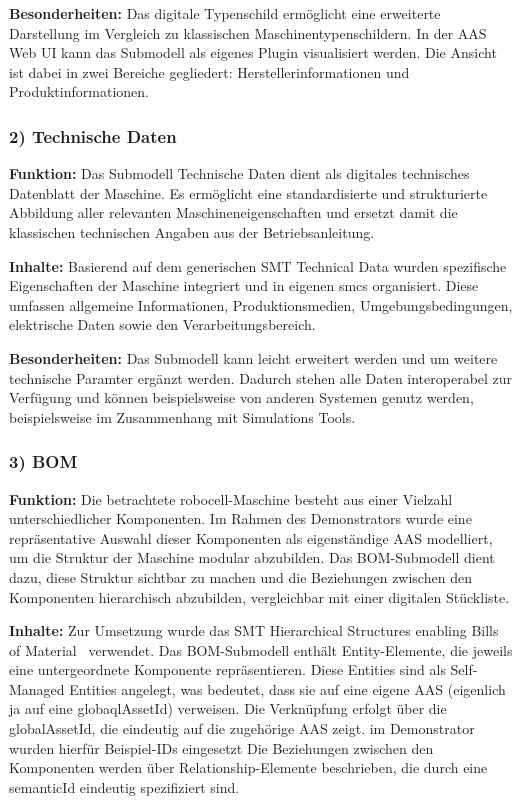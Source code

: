 \textbf{Besonderheiten:}  
Das digitale Typenschild ermöglicht eine erweiterte Darstellung im Vergleich zu klassischen Maschinentypenschildern.  
In der AAS Web UI kann das Submodell als eigenes Plugin visualisiert werden. 
Die Ansicht ist dabei in zwei Bereiche gegliedert: Herstellerinformationen und Produktinformationen.

\subsubsection*{2) Technische Daten}
\vspace{-0.5em}
\textbf{Funktion:}  
Das Submodell Technische Daten dient als digitales technisches Datenblatt der Maschine.
Es ermöglicht eine standardisierte und strukturierte Abbildung aller relevanten Maschineneigenschaften und ersetzt damit die klassischen technischen Angaben aus der Betriebsanleitung.

\textbf{Inhalte:}  
Basierend auf dem generischen SMT Technical Data \cite{SpezifikaitonTechnischeDaten} wurden spezifische Eigenschaften der Maschine integriert und in eigenen \acsp{smc} organisiert. 
Diese umfassen allgemeine Informationen, Produktionsmedien, Umgebungsbedingungen, elektrische Daten sowie den Verarbeitungsbereich.

\textbf{Besonderheiten:}  
Das Submodell kann leicht erweitert werden und um weitere technische Paramter ergänzt werden.
Dadurch stehen alle Daten interoperabel zur Verfügung und können beispielsweise von anderen Systemen genutz werden, beispielsweise im Zusammenhang mit Simulations Tools.

\subsubsection*{3) BOM}
\vspace{-0.5em}
\textbf{Funktion:}  
Die betrachtete robocell-Maschine besteht aus einer Vielzahl unterschiedlicher Komponenten.
Im Rahmen des Demonstrators wurde eine repräsentative Auswahl dieser Komponenten als eigenständige AAS modelliert, um die Struktur der Maschine modular abzubilden.
Das BOM-Submodell dient dazu, diese Struktur sichtbar zu machen und die Beziehungen zwischen den Komponenten hierarchisch abzubilden, vergleichbar mit einer digitalen Stückliste.

\textbf{Inhalte:}  
Zur Umsetzung wurde das SMT Hierarchical Structures enabling Bills of Material~\cite{SpezifikationHierachischeStrukturen} verwendet.
Das BOM-Submodell enthält Entity-Elemente, die jeweils eine untergeordnete Komponente repräsentieren.
Diese Entities sind als Self-Managed Entities angelegt, was bedeutet, dass sie auf eine eigene AAS (eigenlich ja auf eine globaqlAssetId) verweisen.
Die Verknüpfung erfolgt über die globalAssetId, die eindeutig auf die zugehörige AAS zeigt.
im Demonstrator wurden hierfür Beispiel-IDs eingesetzt
Die Beziehungen zwischen den Komponenten werden über Relationship-Elemente beschrieben, die durch eine semanticId eindeutig spezifiziert sind.

